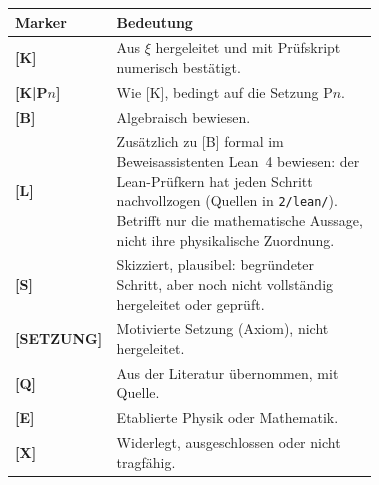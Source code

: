 
\begin{center}
\small
\begin{tabular}{@{}lp{0.72\linewidth}@{}}
\toprule
\textbf{Marker} & \textbf{Bedeutung} \\
\midrule
\textbf{[K]} & Aus $\xi$ hergeleitet und mit Prüfskript numerisch bestätigt. \\
\textbf{[K|P$n$]} & Wie [K], bedingt auf die Setzung P$n$. \\
\textbf{[B]} & Algebraisch bewiesen. \\
\textbf{[L]} & Zusätzlich zu [B] formal im Beweisassistenten Lean~4 bewiesen: der Lean-Prüfkern hat jeden Schritt nachvollzogen (Quellen in \texttt{2/lean/}). Betrifft nur die mathematische Aussage, nicht ihre physikalische Zuordnung. \\
\textbf{[S]} & Skizziert, plausibel: begründeter Schritt, aber noch nicht vollständig hergeleitet oder geprüft. \\
\textbf{[SETZUNG]} & Motivierte Setzung (Axiom), nicht hergeleitet. \\
\textbf{[Q]} & Aus der Literatur übernommen, mit Quelle. \\
\textbf{[E]} & Etablierte Physik oder Mathematik. \\
\textbf{[X]} & Widerlegt, ausgeschlossen oder nicht tragfähig. \\
\bottomrule
\end{tabular}
\end{center}
